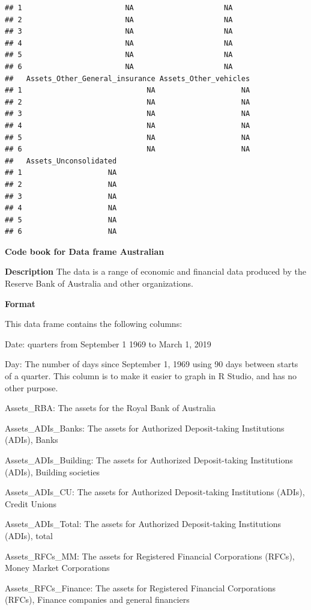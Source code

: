 \documentclass[
]{book}
\begin{document}
\begin{verbatim}
## 1                        NA                     NA
## 2                        NA                     NA
## 3                        NA                     NA
## 4                        NA                     NA
## 5                        NA                     NA
## 6                        NA                     NA
##   Assets_Other_General_insurance Assets_Other_vehicles
## 1                             NA                    NA
## 2                             NA                    NA
## 3                             NA                    NA
## 4                             NA                    NA
## 5                             NA                    NA
## 6                             NA                    NA
##   Assets_Unconsolidated
## 1                    NA
## 2                    NA
## 3                    NA
## 4                    NA
## 5                    NA
## 6                    NA
\end{verbatim}

\textbf{Code book for Data frame Australian}

\textbf{Description}
The data is a range of economic and financial data produced by the Reserve Bank of Australia and other organizations.

\textbf{Format}

This data frame contains the following columns:

Date: quarters from September 1 1969 to March 1, 2019

Day: The number of days since September 1, 1969 using 90 days between starts of a quarter. This column is to make it easier to graph in R Studio, and has no other purpose.

Assets\_RBA: The assets for the Royal Bank of Australia

Assets\_ADIs\_Banks: The assets for Authorized Deposit-taking Institutions (ADIs), Banks

Assets\_ADIs\_Building: The assets for Authorized Deposit-taking Institutions (ADIs), Building societies

Assets\_ADIs\_CU: The assets for Authorized Deposit-taking Institutions (ADIs), Credit Unions

Assets\_ADIs\_Total: The assets for Authorized Deposit-taking Institutions (ADIs), total

Assets\_RFCs\_MM: The assets for Registered Financial Corporations (RFCs), Money Market Corporations

Assets\_RFCs\_Finance: The assets for Registered Financial Corporations (RFCs), Finance companies and general financiers
\end{document}
